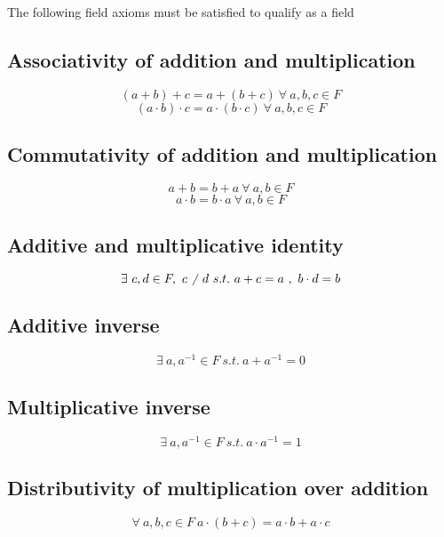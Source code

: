 \documentclass[10pt,a4paper]{report}
\begin{document}
The following field axioms must be satisfied to qualify as a field

\subsection*{Associativity of addition and multiplication}
\begin{equation}
	(a + b) + c = a + (b + c)\ \forall\ a,b,c \in F
\end{equation}
\begin{equation}
	(a \cdot b) \cdot c = a \cdot (b \cdot c)\ \forall\ a,b,c \in F
\end{equation}
\subsection*{Commutativity of addition and multiplication}
\begin{equation}
	a + b = b + a\ \forall\ a,b \in F 
\end{equation}
\begin{equation}
	a \cdot b = b \cdot a\ \forall\ a,b \in F 
\end{equation}
\subsection*{Additive and multiplicative identity}
\begin{equation}
	\exists\ c,d \in F,\ c \not\ \ d\ s.t.\ a + c = a\ ,\ b \cdot d = b
\end{equation}
\subsection*{Additive inverse}
\begin{equation}
	\exists\ a,a^{-1} \in F\ s.t.\ a + a^{-1} = 0
\end{equation}
\subsection*{Multiplicative inverse}
\begin{equation}
	\exists\ a,a^{-1} \in F\ s.t.\ a \cdot a^{-1} = 1
\end{equation}
\subsection*{Distributivity of multiplication over addition}
\begin{equation}
	\forall\ a,b,c \in F\ a \cdot (b + c) = a \cdot b + a \cdot c
\end{equation}
\end{document}

